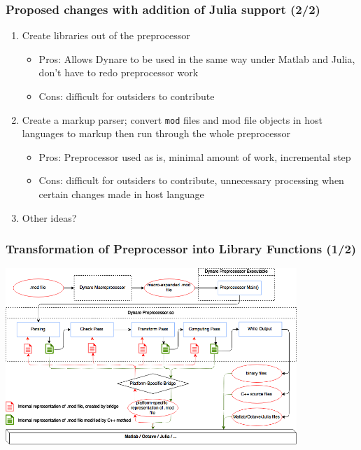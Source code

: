 \documentclass{beamer}
\begin{document}
\begin{frame}
  \frametitle{Proposed changes with addition of Julia support (2/2)}
  \begin{enumerate}
    \suite
  \item Create libraries out of the preprocessor
    \begin{itemize}
    \item Pros: Allows Dynare to be used in the same way under Matlab and Julia, don't have to redo preprocessor work
    \item Cons: difficult for outsiders to contribute
    \end{itemize}
  \item Create a markup parser; convert \texttt{mod} files and mod file objects in host languages to markup then run through the whole preprocessor
    \begin{itemize}
    \item Pros: Preprocessor used as is, minimal amount of work, incremental step
    \item Cons: difficult for outsiders to contribute, unnecessary processing when certain changes made in host language
    \end{itemize}
  \item Other ideas?
  \end{enumerate}
\end{frame}

\begin{frame}
  \frametitle{Transformation of Preprocessor into Library Functions (1/2)}
  \begin{center}
    \includegraphics[width=11cm]{library-preprocessor.png}
  \end{center}
\end{frame}
\end{document}
